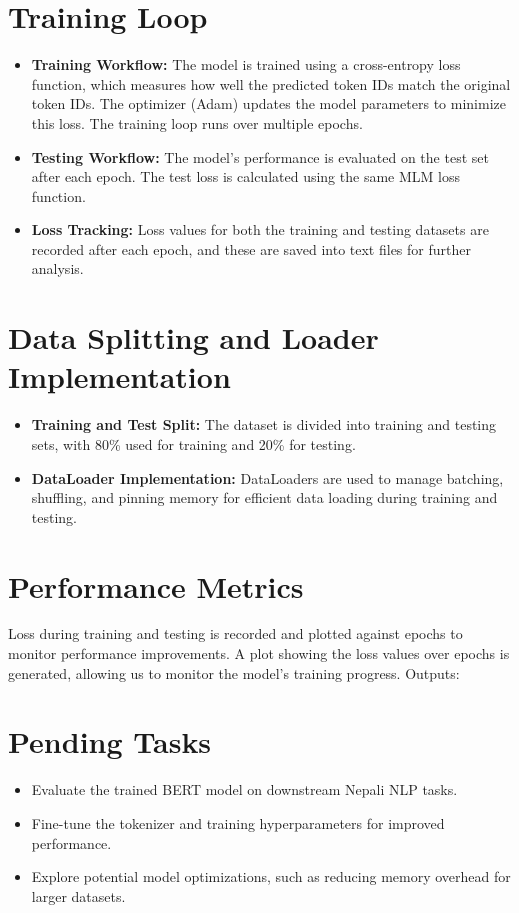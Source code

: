 \section{Training Loop}
\begin{itemize}
    \item \textbf{Training Workflow:} The model is trained using a cross-entropy loss function, which measures how well the predicted token IDs match the original token IDs. The optimizer (Adam) updates the model parameters to minimize this loss. The training loop runs over multiple epochs.
    \item \textbf{Testing Workflow:} The model's performance is evaluated on the test set after each epoch. The test loss is calculated using the same MLM loss function.
    \item \textbf{Loss Tracking:} Loss values for both the training and testing datasets are recorded after each epoch, and these are saved into text files for further analysis.
\end{itemize}

\section{Data Splitting and Loader Implementation}
\begin{itemize}
    \item \textbf{Training and Test Split:} The dataset is divided into training and testing sets, with 80\% used for training and 20\% for testing.
    \item \textbf{DataLoader Implementation:} DataLoaders are used to manage batching, shuffling, and pinning memory for efficient data loading during training and testing.
\end{itemize}

\section{Performance Metrics}
Loss during training and testing is recorded and plotted against epochs to monitor performance improvements. A plot showing the loss values over epochs is generated, allowing us to monitor the model's training progress.
Outputs:


\section{Pending Tasks}
\begin{itemize}
    \item Evaluate the trained BERT model on downstream Nepali NLP tasks.
    \item Fine-tune the tokenizer and training hyperparameters for improved performance.
    \item Explore potential model optimizations, such as reducing memory overhead for larger datasets.
\end{itemize}

